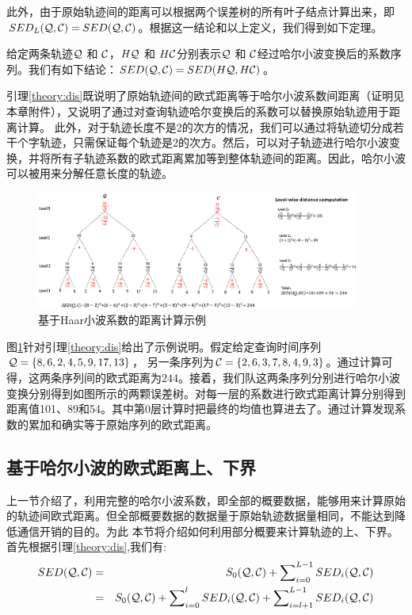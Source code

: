 此外，由于原始轨迹间的距离可以根据两个误差树的所有叶子结点计算出来，即$SED_{L}{(\cal Q, \cal C)} = SED(\cal Q, \cal C)$。根据这一结论和以上定义，我们得到如下定理。
\begin{lemma}\label{theory:dis}
	给定两条轨迹${\cal Q}$ 和 ${\cal C}$，$H{\cal Q}$ 和 $H{\cal C}$分别表示${\cal Q}$ 和 ${\cal C}$经过哈尔小波变换后的系数序列。我们有如下结论：$SED({\cal Q},{\cal C})=SED(H{\cal Q},H{\cal C})$。
\end{lemma}
引理\ref{theory:dis}既说明了原始轨迹间的欧式距离等于哈尔小波系数间距离（证明见本章附件），又说明了通过对查询轨迹哈尔变换后的系数可以替换原始轨迹用于距离计算。
此外，对于轨迹长度不是2的次方的情况，我们可以通过将轨迹切分成若干个字轨迹，只需保证每个轨迹是2的次方。然后，可以对子轨迹进行哈尔小波变换，并将所有子轨迹系数的欧式距离累加等到整体轨迹间的距离。因此，哈尔小波可以被用来分解任意长度的轨迹。

\begin{figure}
	\centering
	\includegraphics[width=0.95\textwidth]{Fig/chapter4/distance}
	\caption{基于Haar小波系数的距离计算示例}
	\label{fig-chapter4-distance}
\end{figure}

图\ref{fig-chapter4-distance}针对引理\ref{theory:dis}给出了示例说明。假定给定查询时间序列${\cal Q} = \{8, 6, 2, 4, 5, \\9, 17, 13\}$，
另一条序列为${\cal C}=\{2, 6, 3, 7, 8, 4, 9, 3\}$。通过计算可得，这两条序列间的欧式距离为$244$。接着，我们队这两条序列分别进行哈尔小波变换分别得到如图所示的两颗误差树。对每一层的系数进行欧式距离计算分别得到距离值101、89和54。其中第$0$层计算时把最终的均值也算进去了。通过计算发现系数的累加和确实等于原始序列的欧式距离。

\subsection{基于哈尔小波的欧式距离上、下界}
上一节介绍了，利用完整的哈尔小波系数，即全部的概要数据，能够用来计算原始的轨迹间欧式距离。但全部概要数据的数据量于原始轨迹数据量相同，不能达到降低通信开销的目的。为此
本节将介绍如何利用部分概要来计算轨迹的上、下界。首先根据引理\ref{theory:dis},我们有:
\begin{eqnarray}\label{eq:match}
SED({\cal Q},{\cal C}) &=&S_{0}({\cal Q},{\cal C}) +  \sum\nolimits_{i=0}^{L-1}SED_{i}({\cal Q},{\cal C}) \nonumber\\ 
           &=&S_{0}({\cal Q},{\cal C}) + \sum\nolimits_{i=0}^{l}SED_{i}({\cal Q},{\cal C})+\sum\nolimits_{i=l+1}^{L-1}SED_{i}({\cal Q},{\cal C})
\end{eqnarray}

